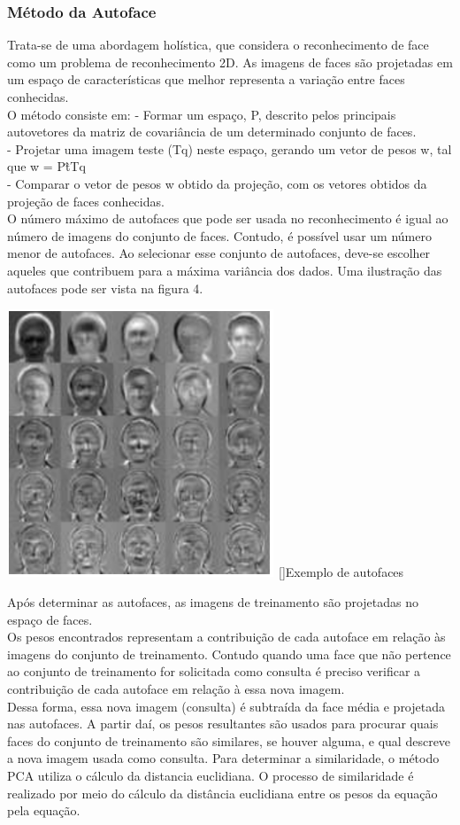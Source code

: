 \documentclass[a4paper,11pt]{article}
\newenvironment{Figure}
  {\par\medskip\noindent\minipage{\linewidth}}
    {\endminipage\par\medskip}
\begin{document}
\begin{multicols}{2}
\subsubsection{Método da Autoface}
Trata-se de uma abordagem holística, que considera o reconhecimento de face como um problema de reconhecimento 2D. As imagens de faces são projetadas em um espaço de características que melhor representa a variação entre faces conhecidas. \\
O método consiste em:
- Formar um espaço, P, descrito pelos principais autovetores da matriz de covariância de um determinado conjunto de faces.\\
- Projetar uma imagem teste (Tq) neste espaço, gerando um vetor de pesos w, tal que w = P\^tTq \\
- Comparar o vetor de pesos w obtido da projeção, com os vetores obtidos da projeção de faces conhecidas. \\
O número máximo de autofaces que pode ser usada no reconhecimento é igual ao número de imagens do conjunto de faces. Contudo, é possível usar um número menor de autofaces. Ao selecionar esse conjunto de autofaces, deve-se escolher aqueles que contribuem para a máxima variância dos dados. Uma ilustração das autofaces pode ser vista na figura 4.

\begin{Figure}
	\centering 
	\includegraphics[width=8cm, height=8cm]{imagem4}
	[]{Exemplo de autofaces}
	\label{medium}	
\end{Figure}
Após determinar as autofaces, as imagens de treinamento são projetadas no espaço de faces.\\
Os pesos encontrados representam a contribuição de cada autoface em relação às imagens do conjunto de treinamento. Contudo quando uma face que não pertence ao conjunto de treinamento for solicitada como consulta é preciso verificar a contribuição de cada autoface em relação à essa nova imagem.\\
Dessa forma, essa nova imagem (consulta) é subtraída da face média e projetada nas autofaces. A partir daí, os pesos resultantes são usados para procurar quais faces do conjunto de treinamento são similares, se houver alguma, e qual descreve a nova imagem usada como consulta. Para determinar a similaridade, o método PCA utiliza o cálculo da distancia euclidiana. O processo de similaridade é realizado por meio do cálculo da distância euclidiana entre os pesos da equação pela equação.


\end{multicols}
\end{document}
